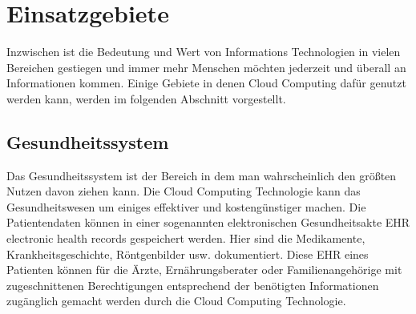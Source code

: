 \section{Einsatzgebiete}
Inzwischen ist die Bedeutung und Wert von Informations Technologien in vielen Bereichen gestiegen und immer mehr Menschen möchten jederzeit und überall an Informationen kommen. Einige Gebiete in denen Cloud Computing dafür genutzt werden kann, werden im folgenden Abschnitt vorgestellt.

\subsection{Gesundheitssystem}
Das Gesundheitssystem ist der Bereich in dem man wahrscheinlich den größten Nutzen davon ziehen kann. Die Cloud Computing Technologie kann das Gesundheitswesen um einiges effektiver und kostengünstiger machen. Die Patientendaten können in einer sogenannten elektronischen Gesundheitsakte EHR \glqq electronic health records\grqq{} gespeichert werden. Hier sind die Medikamente, Krankheitsgeschichte, Röntgenbilder usw. dokumentiert. Diese EHR eines Patienten können für die Ärzte, Ernährungsberater oder Familienangehörige mit zugeschnittenen Berechtigungen entsprechend der benötigten Informationen zugänglich gemacht werden durch die Cloud Computing Technologie.